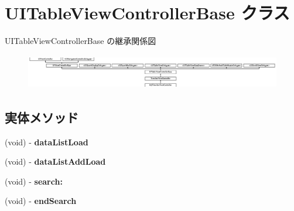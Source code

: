 \hypertarget{interface_u_i_table_view_controller_base}{}\section{U\+I\+Table\+View\+Controller\+Base クラス}
\label{interface_u_i_table_view_controller_base}
U\+I\+Table\+View\+Controller\+Base の継承関係図\begin{figure}[H]
\begin{center}
\leavevmode
\includegraphics[height=1.535088cm]{interface_u_i_table_view_controller_base}
\end{center}
\end{figure}
\subsection*{実体メソッド}
\begin{DoxyCompactItemize}
\item 
\hypertarget{interface_u_i_table_view_controller_base_aa166f4744ec34382bf4728ee4b207386}{}(void) -\/ {\bfseries data\+List\+Load}\label{interface_u_i_table_view_controller_base_aa166f4744ec34382bf4728ee4b207386}

\item 
\hypertarget{interface_u_i_table_view_controller_base_ac999620596f78122b77b877d4b19654d}{}(void) -\/ {\bfseries data\+List\+Add\+Load}\label{interface_u_i_table_view_controller_base_ac999620596f78122b77b877d4b19654d}

\item 
\hypertarget{interface_u_i_table_view_controller_base_a81c667d22dac92f9db18fcd0de77c3f9}{}(void) -\/ {\bfseries search\+:}\label{interface_u_i_table_view_controller_base_a81c667d22dac92f9db18fcd0de77c3f9}

\item 
\hypertarget{interface_u_i_table_view_controller_base_afa822a0407fede072c030361fa1d8a1d}{}(void) -\/ {\bfseries end\+Search}\label{interface_u_i_table_view_controller_base_afa822a0407fede072c030361fa1d8a1d}

\end{DoxyCompactItemize}
